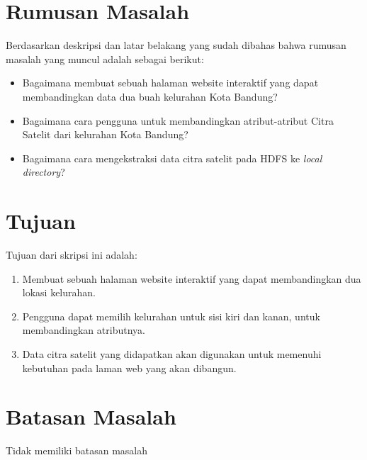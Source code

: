 \section{Rumusan Masalah}
\label{sec:rumusan}
Berdasarkan deskripsi dan latar belakang yang sudah dibahas bahwa rumusan masalah yang muncul adalah sebagai berikut:

\begin{itemize}
	\item Bagaimana membuat sebuah halaman website interaktif yang dapat membandingkan data dua buah kelurahan Kota Bandung?
	\item Bagaimana cara pengguna untuk membandingkan atribut-atribut Citra Satelit dari kelurahan Kota Bandung?
	\item Bagaimana cara mengekstraksi data citra satelit pada HDFS ke \textit{local directory}?	
\end{itemize}

\section{Tujuan}
\label{sec:tujuan}
Tujuan dari skripsi ini adalah:
\begin{enumerate}
	\item Membuat sebuah halaman website interaktif yang dapat membandingkan dua lokasi kelurahan.
	\item Pengguna dapat memilih kelurahan untuk sisi kiri dan kanan, untuk membandingkan atributnya.
	\item Data citra satelit yang didapatkan akan digunakan untuk memenuhi kebutuhan pada laman web yang akan dibangun.
\end{enumerate}


\section{Batasan Masalah}
\label{sec:batasan}
Tidak memiliki batasan masalah

